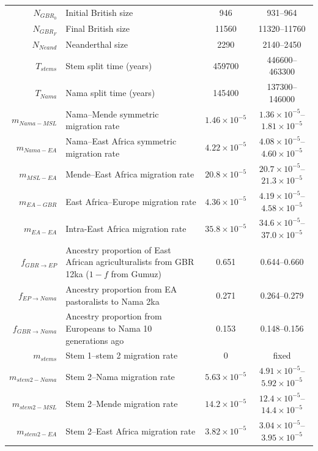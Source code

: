 \documentclass[]{article}
\begin{document}
\begin{table}[ht]
\begin{tabular}[t]{rP{8cm}cc}
    $N_{GBR_0}$ & Initial British size & 946 & 931--964 \\
    $N_{GBR_F}$ & Final British size & 11560 & 11320--11760 \\
    $N_{Neand}$ & Neanderthal size & 2290 & 2140--2450 \\
    $T_{stems}$ & Stem split time (years) & 459700 & 446600--463300 \\
    $T_{Nama}$ & Nama split time (years) & 145400 & 137300--146000 \\
    $m_{Nama-MSL}$ & Nama--Mende symmetric migration rate & $1.46\times10^{-5}$ & $1.36\times10^{-5}$--$1.81\times10^{-5}$ \\
    $m_{Nama-EA}$ & Nama--East Africa symmetric migration rate & $4.22\times10^{-5}$ & $4.08\times10^{-5}$--$4.60\times10^{-5}$ \\
    $m_{MSL-EA}$ & Mende--East Africa migration rate & $20.8\times10^{-5}$ & $20.7\times10^{-5}$--$21.3\times10^{-5}$ \\
    $m_{EA-GBR}$ & East Africa--Europe migration rate & $4.36\times10^{-5}$ & $4.19\times10^{-5}$--$4.58\times10^{-5}$ \\
    $m_{EA-EA}$ & Intra-East Africa migration rate & $35.8\times10^{-5}$ & $34.6\times10^{-5}$--$37.0\times10^{-5}$ \\
    $f_{GBR \rightarrow EP}$ & Ancestry proportion of East African agriculturalists from GBR 12ka ($1-f$ from Gumuz) & 0.651 & 0.644--0.660 \\
    $f_{EP \rightarrow Nama}$ & Ancestry proportion from EA pastoralists to Nama 2ka & 0.271 & 0.264--0.279 \\
    $f_{GBR \rightarrow Nama}$ & Ancestry proportion from Europeans to Nama 10 generations ago & 0.153 & 0.148--0.156 \\
    $m_{stems}$ & Stem 1--stem 2 migration rate & $0$ & fixed \\
    $m_{stem2-Nama}$ & Stem 2--Nama migration rate & $5.63\times10^{-5}$ & $4.91\times10^{-5}$--$5.92\times10^{-5}$ \\
    $m_{stem2-MSL}$ & Stem 2--Mende migration rate & $14.2\times10^{-5}$ & $12.4\times10^{-5}$--$14.4\times10^{-5}$ \\
    $m_{stem2-EA}$ & Stem 2--East Africa migration rate & $3.82\times10^{-5}$ & $3.04\times10^{-5}$--$3.95\times10^{-5}$ \\
    \bottomrule
\end{tabular}
\end{table}
\end{document}
